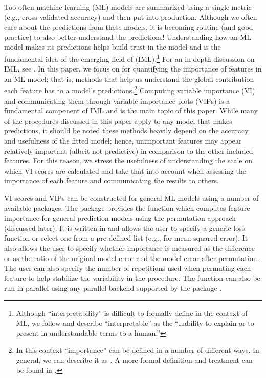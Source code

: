 Too often machine learning (ML) models are summarized using a single
metric (e.g., cross-validated accuracy) and then put into production.
Although we often care about the predictions from these models, it is
becoming routine (and good practice) to also better understand the
predictions! Understanding how an ML model makes its predictions helps
build trust in the model and is the fundamental idea of the emerging
field of  (IML).\footnote{Although
  ``interpretability'' is difficult to formally define in the context of
  ML, we follow \citet{doshivelez-2017-rigorous} and describe
  ``interpretable'' as the ``\ldots{}ability to explain or to present in
  understandable terms to a human.''} For an in-depth discussion on IML,
see \citet{molnar-2019-iml}. In this paper, we focus on
 for quantifying the importance of features in an ML
model; that is, methods that help us understand the global contribution
each feature has to a model's predictions.\footnote{In this context
  ``importance'' can be defined in a number of different ways. In
  general, we can describe it as
  .
  A more formal definition and treatment can be found in
  \citet{laan-2006-statistical}.} Computing variable importance (VI) and
communicating them through variable importance plots (VIPs) is a
fundamental component of IML and is the main topic of this paper. While
many of the procedures discussed in this paper apply to any model that
makes predictions, it should be noted these methods heavily depend on
the accuracy and usefulness of the fitted model; hence, unimportant
features may appear relatively important (albeit not predictive) in
comparison to the other included features. For this reason, we stress
the usefulness of understanding the scale on which VI scores are
calculated and take that into account when assessing the importance of
each feature and communicating the results to others.

VI scores and VIPs can be constructed for general ML models using a
number of available packages. The  package \citep{R-iml}
provides the  function which computes feature
importance for general prediction models using the permutation approach
(discussed later). It is written in  \citep{R-R6} and allows
the user to specify a generic loss function or select one from a
pre-defined list (e.g.,  for mean squared error). It
also allows the user to specify whether importance is measured as the
difference or as the ratio of the original model error and the model
error after permutation. The user can also specify the number of
repetitions used when permuting each feature to help stabilize the
variability in the procedure. The  function can
also be run in parallel using any parallel backend supported by the
 package \citep{R-foreach}.

